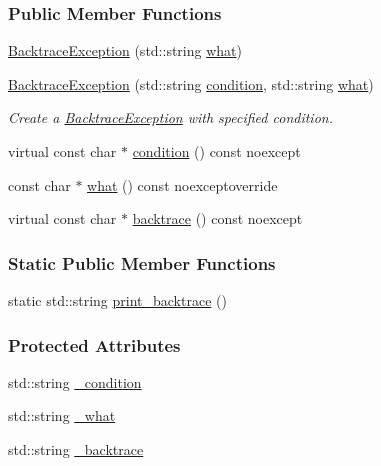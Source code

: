 \subsubsection*{Public Member Functions}
\begin{DoxyCompactItemize}
\item 
\hyperlink{classbacktrace__exception_1_1BacktraceException_acce2185f53042c593cdc55bb8f3ef289}{Backtrace\+Exception} (std\+::string \hyperlink{classbacktrace__exception_1_1BacktraceException_a865bf08728344df9ed42bb5f6aef048f}{what})
\item 
\hyperlink{classbacktrace__exception_1_1BacktraceException_ae12ee4db6c4d7ebbd1d1abf0a572642a}{Backtrace\+Exception} (std\+::string \hyperlink{classbacktrace__exception_1_1BacktraceException_accccd52bdfdbb1ffca58a695dace84f2}{condition}, std\+::string \hyperlink{classbacktrace__exception_1_1BacktraceException_a865bf08728344df9ed42bb5f6aef048f}{what})
\begin{DoxyCompactList}\small\item\em Create a \hyperlink{classbacktrace__exception_1_1BacktraceException}{Backtrace\+Exception} with specified condition. \end{DoxyCompactList}\item 
virtual const char $\ast$ \hyperlink{classbacktrace__exception_1_1BacktraceException_accccd52bdfdbb1ffca58a695dace84f2}{condition} () const noexcept
\item 
const char $\ast$ \hyperlink{classbacktrace__exception_1_1BacktraceException_a865bf08728344df9ed42bb5f6aef048f}{what} () const noexceptoverride
\item 
virtual const char $\ast$ \hyperlink{classbacktrace__exception_1_1BacktraceException_a7454505fabaa8d6ef8396049f7d4e775}{backtrace} () const noexcept
\end{DoxyCompactItemize}
\subsubsection*{Static Public Member Functions}
\begin{DoxyCompactItemize}
\item 
static std\+::string \hyperlink{classbacktrace__exception_1_1BacktraceException_aef24b0571ea422191026a2292947810a}{print\+\_\+backtrace} ()
\end{DoxyCompactItemize}
\subsubsection*{Protected Attributes}
\begin{DoxyCompactItemize}
\item 
std\+::string \hyperlink{classbacktrace__exception_1_1BacktraceException_a3e43ec7625a2390fdfad8fffd4ab126c}{\+\_\+condition}
\item 
std\+::string \hyperlink{classbacktrace__exception_1_1BacktraceException_ad935d6512b6b4a6c4ea79843391b5a1e}{\+\_\+what}
\item 
std\+::string \hyperlink{classbacktrace__exception_1_1BacktraceException_a86f9233184b7611b08faaf19b9490f43}{\+\_\+backtrace}
\end{DoxyCompactItemize}


